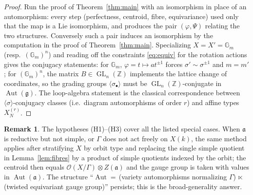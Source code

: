 \documentclass{amsart}
\theoremstyle{definition}
\newtheorem{remark}{Remark}
\DeclareMathOperator{\Aut}{Aut}
\DeclareMathOperator{\GL}{GL}
\newcommand{\Gm}{\mathbb{G}_m}
\newcommand{\g}{\mathfrak{g}}
\newcommand{\fa}{\mathfrak{a}}
\newcommand{\OO}{\mathcal{O}}
\newcommand{\Z}{\mathbb{Z}}
\begin{document}
\begin{proof}
Run the proof of Theorem~\ref{thm:main} with an isomorphism in place of an
automorphism: every step (perfectness, centroid, fibre, equivariance) used
only that the map is a Lie isomorphism, and produces the pair
$(\varphi,\Psi)$ relating the two structures.  Conversely such a pair
induces an isomorphism by the computation in the proof of
Theorem~\ref{thm:main}.  Specializing $X=X'=\Gm$ (resp.\ $(\Gm)^n$) and
reading off the constraints \eqref{eq:equiv} for the rotation actions gives
the conjugacy statements: for $\Gm$, $\varphi=t\mapsto at^{\pm1}$ forces
$\sigma'\sim\sigma^{\pm1}$ and $m=m'$; for $(\Gm)^n$, the matrix
$B\in\GL_n(\Z)$ implements the lattice change of coordinates, so the
grading groups $\langle\sigma_\bullet\rangle$ must be $\GL_n(\Z)$-conjugate
in $\Aut(\g)$.  The loop-algebra statement is the classical correspondence
between $\langle\sigma\rangle$-conjugacy classes (i.e.\ diagram
automorphisms of order $r$) and affine types $X_N^{(r)}$.
\end{proof}

\begin{remark}
The hypotheses (H1)--(H3) cover all the listed special cases.  When $\fa$
is reductive but not simple, or $\Gamma$ does not act freely on $X(k)$, the
same method applies after stratifying $X$ by orbit type and replacing the
single simple quotient in Lemma~\ref{lem:fibres} by a product of simple
quotients indexed by the orbit; the centroid then equals
$\OO(X/\Gamma)\otimes Z(\fa)$ and the gauge group is taken with values in
$\Aut(\fa)$.  The structure
``$\Aut=\,$(variety automorphisms normalizing $\Gamma$)$\,\ltimes\,$(twisted
equivariant gauge group)'' persists; this is the broad-generality answer.
\end{remark}
\end{document}
